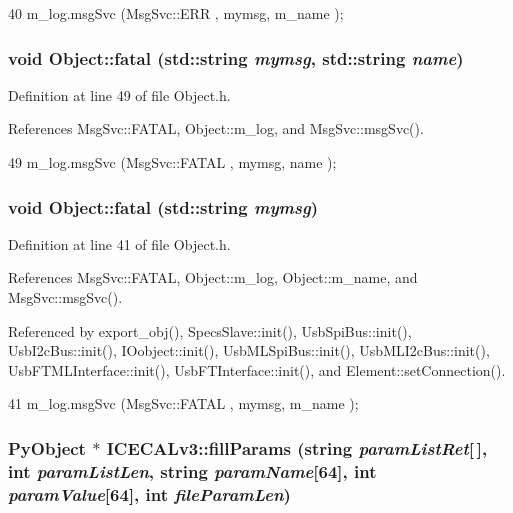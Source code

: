 \begin{DoxyCode}
40 { m_log.msgSvc (MsgSvc::ERR     , mymsg, m_name ); }
\end{DoxyCode}
\hypertarget{classObject_ae62acd3d09f716220f75f252dc38bc9a}{
\subsubsection[{fatal}]{\setlength{\rightskip}{0pt plus 5cm}void Object::fatal (std::string {\em mymsg}, \/  std::string {\em name})}}
\label{classObject_ae62acd3d09f716220f75f252dc38bc9a}


Definition at line 49 of file Object.h.

References MsgSvc::FATAL, Object::m\_\-log, and MsgSvc::msgSvc().


\begin{DoxyCode}
49 { m_log.msgSvc (MsgSvc::FATAL   , mymsg, name ); }
\end{DoxyCode}
\hypertarget{classObject_aad5a16aac7516ce65bd5ec02ab07fc80}{
\subsubsection[{fatal}]{\setlength{\rightskip}{0pt plus 5cm}void Object::fatal (std::string {\em mymsg})}}
\label{classObject_aad5a16aac7516ce65bd5ec02ab07fc80}


Definition at line 41 of file Object.h.

References MsgSvc::FATAL, Object::m\_\-log, Object::m\_\-name, and MsgSvc::msgSvc().

Referenced by export\_\-obj(), SpecsSlave::init(), UsbSpiBus::init(), UsbI2cBus::init(), IOobject::init(), UsbMLSpiBus::init(), UsbMLI2cBus::init(), UsbFTMLInterface::init(), UsbFTInterface::init(), and Element::setConnection().


\begin{DoxyCode}
41 { m_log.msgSvc (MsgSvc::FATAL   , mymsg, m_name ); }
\end{DoxyCode}
\hypertarget{classICECALv3_ac006abc42a048308427f6801d783a407}{
\subsubsection[{fillParams}]{\setlength{\rightskip}{0pt plus 5cm}PyObject $\ast$ ICECALv3::fillParams (string {\em paramListRet}\mbox{[}$\,$\mbox{]}, \/  int {\em paramListLen}, \/  string {\em paramName}\mbox{[}64\mbox{]}, \/  int {\em paramValue}\mbox{[}64\mbox{]}, \/  int {\em fileParamLen})}}
\label{classICECALv3_ac006abc42a048308427f6801d783a407}


